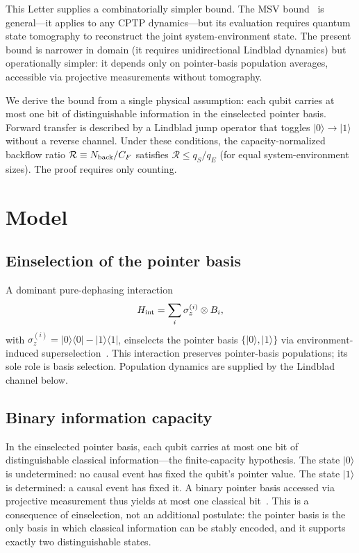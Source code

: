 \documentclass[aps,pra,twocolumn,superscriptaddress,hyperref]{revtex4-2}
\begin{document}
This Letter supplies a combinatorially simpler bound. The MSV bound~\cite{Megier:2021} is general---it applies to any CPTP dynamics---but its evaluation requires quantum state tomography to reconstruct the joint system-environment state. The present bound is narrower in domain (it requires unidirectional Lindblad dynamics) but operationally simpler: it depends only on pointer-basis population averages, accessible via projective measurements without tomography.

We derive the bound from a single physical assumption: each qubit carries at most one bit of distinguishable information in the einselected pointer basis. Forward transfer is described by a Lindblad jump operator that toggles $|0\rangle \to |1\rangle$ without a reverse channel. Under these conditions, the capacity-normalized backflow ratio $\mathcal{R} \equiv N_{\rm back}/C_F$ satisfies $\mathcal{R} \leq q_S/q_E$ (for equal system-environment sizes). The proof requires only counting.

\section{Model}
\label{sec:model}

\subsection{Einselection of the pointer basis}

A dominant pure-dephasing interaction
\begin{equation}
H_{\rm int} = \sum_{i} \sigma_z^{(i)} \otimes B_i,
\label{eq:hint}
\end{equation}
with $\sigma_z^{(i)} = |0\rangle\langle 0| - |1\rangle\langle 1|$, einselects the pointer basis $\{|0\rangle,|1\rangle\}$ via environment-induced superselection~\cite{Zurek:2003}. This interaction preserves pointer-basis populations; its sole role is basis selection. Population dynamics are supplied by the Lindblad channel below.

\subsection{Binary information capacity}

In the einselected pointer basis, each qubit carries at most one bit of distinguishable classical information---the finite-capacity hypothesis. The state $|0\rangle$ is undetermined: no causal event has fixed the qubit's pointer value. The state $|1\rangle$ is determined: a causal event has fixed it. A binary pointer basis accessed via projective measurement thus yields at most one classical bit~\cite{Zurek:2003}. This is a consequence of einselection, not an additional postulate: the pointer basis is the only basis in which classical information can be stably encoded, and it supports exactly two distinguishable states.
\end{document}
